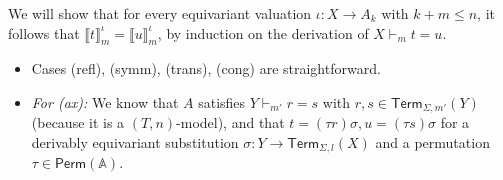 \documentclass[11pt,a4paper]{amsart}
\newcommand{\Perm}{\mathsf{Perm}(\Names)}
\newcommand{\Term}{\mathsf{Term}}
\newcommand{\sigp}{\Sigma_0}
\newcommand{\sigf}{\Sigma_{\mathsf f}}
\newcommand{\sigb}{\Sigma_{\mathsf b}}
\newcommand{\Names}{\mathbb{A}}
\theoremstyle{plain}
\numberwithin{equation}{section}
\newcommand{\+}[1]{\mathcal{#1}\xspace}
\theoremstyle{definition}
\begin{document}
    We will show that for every equivariant valuation \(\iota: X \to A_k\) with \(k + m \le n\), it follows that \(\llbracket t \rrbracket^\iota_m = \llbracket u \rrbracket^\iota_m\), by induction on the derivation of \(X \vdash_m t = u\).
    \begin{itemize}
        \item
            Cases (refl), (symm), (trans), (cong) are straightforward.
        \item
            \textit{For (ax):}
            We know that \(A\) satisfies \(Y \vdash_{m'} r = s\) with \(r, s \in \Term_{\Sigma, m'}(Y)\) (because it is a \((T, n)\)-model), and that \(t = (\tau r)\sigma, u = (\tau s)\sigma\) for a derivably equivariant substitution \(\sigma: Y \to \Term_{\Sigma, l}(X)\) and a permutation \(\tau \in \Perm\).


\end{itemize}
\end{document}
